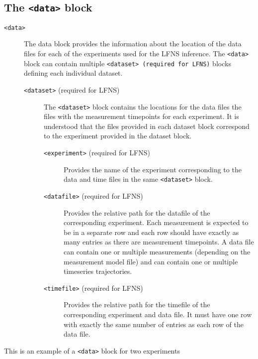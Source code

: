 \documentclass[11pt]{article} %
\begin{document}
\subsection{The \texttt{<data>} block}
\begin{description}
\item[\texttt{<data>}]\label{it:data}The data block provides the information about the location of the data files for each of the experiments used for the LFNS inference. The \texttt{<data>} block can contain multiple \texttt{<dataset> (required for LFNS)} blocks defining each individual dataset. 
\begin{description}
\item[\texttt{<dataset>} (required for LFNS)] The \texttt{<dataset>} block contains the locations for the data files the files with the measurement timepoints for each experiment. It is understood that the files provided in each dataset block correspond to the experiment provided in the dataset block. 
\begin{description}
\item[\texttt{<experiment>} (required for LFNS)] Provides the name of the experiment corresponding to the data and time files in the same \texttt{<dataset>} block. 
\item[\texttt{<datafile>} (required for LFNS)] Provides the relative path for the datafile of the corresponding experiment. Each measurement is expected to be in a separate row and each row should have exactly as many entries as there are measurement timepoints. A data file can contain one or multiple measurements (depending on the measurement model file) and can contain one or multiple timeseries trajectories. 
\item[\texttt{<timefile>} (required for LFNS)] Provides the relative path for the timefile of the corresponding experiment and data file. It must have one row with exactly the same number of entries as each row of the data file. 
\end{description}
\end{description}
\end{description}
This is an example of a \texttt{<data>} block for two experiments
\end{document}
